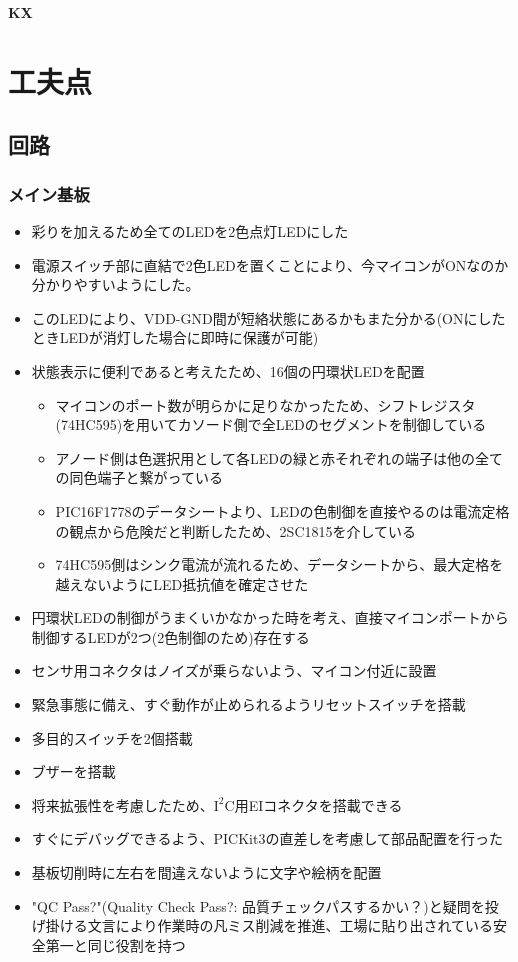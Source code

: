 \documentclass[a4paper]{ltjsarticle}
\newcommand{\kasix}{\textbf{K\hspace{-0.31em}\raisebox{0.17em}{\scalebox{0.7}{A}}\hspace{-0.11em}{S}\hspace{-0.08em}\scalebox{0.8}{i}\hspace{-0.1em}X}}
\begin{document}
\kasix

\section{工夫点}
\subsection{回路}
\subsubsection{メイン基板}
\begin{itemize}
  \item 彩りを加えるため全てのLEDを2色点灯LEDにした
  \item 電源スイッチ部に直結で2色LEDを置くことにより、今マイコンがONなのか分かりやすいようにした。
  \item このLEDにより、VDD-GND間が短絡状態にあるかもまた分かる(ONにしたときLEDが消灯した場合に即時に保護が可能)
  \item 状態表示に便利であると考えたため、16個の円環状LEDを配置
  \begin{itemize}
    \item マイコンのポート数が明らかに足りなかったため、シフトレジスタ(74HC595)を用いてカソード側で全LEDのセグメントを制御している
    \item アノード側は色選択用として各LEDの緑と赤それぞれの端子は他の全ての同色端子と繋がっている
    \item PIC16F1778のデータシート\cite{ds:picEspI}より、LEDの色制御を直接やるのは電流定格の観点から危険だと判断したため、2SC1815を介している
    \item 74HC595側はシンク電流が流れるため、データシート\cite{ds:74hc595EspI}から、最大定格を越えないようにLED抵抗値を確定させた
  \end{itemize}
  \item 円環状LEDの制御がうまくいかなかった時を考え、直接マイコンポートから制御するLEDが2つ(2色制御のため)存在する
  \item センサ用コネクタはノイズが乗らないよう、マイコン付近に設置
  \item 緊急事態に備え、すぐ動作が止められるようリセットスイッチを搭載
  \item 多目的スイッチを2個搭載
  \item ブザーを搭載
  \item 将来拡張性を考慮したため、$\mathrm{I}^\mathrm{2}\mathrm{C}$用EIコネクタを搭載できる
  \item すぐにデバッグできるよう、PICKit3の直差しを考慮して部品配置を行った
  \item 基板切削時に左右を間違えないように文字や絵柄を配置
  \item "QC Pass?"(Quality Check Pass?: 品質チェックパスするかい？)と疑問を投げ掛ける文言により作業時の凡ミス削減を推進、工場に貼り出されている安全第一と同じ役割を持つ
\end{itemize}
\end{document}
